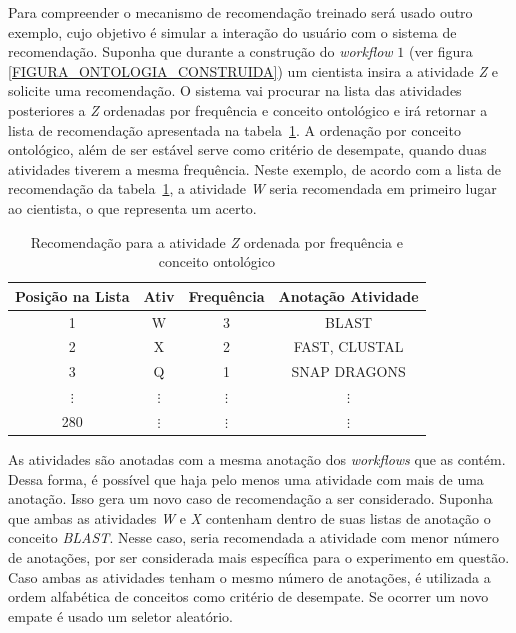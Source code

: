 \documentclass[10pt,letterpaper]{article}
\begin{document}
Para compreender o mecanismo de recomendação treinado será usado outro exemplo, cujo objetivo é simular a interação do usuário com o sistema de recomendação. Suponha que durante a construção do \emph{workflow} \(1\) (ver figura \ref{FIGURA_ONTOLOGIA_CONSTRUIDA}) um cientista insira a atividade \emph{Z} e solicite uma recomendação. O sistema vai procurar na lista das atividades posteriores a \emph{Z} ordenadas por frequência e conceito ontológico e irá retornar a lista de recomendação apresentada na tabela~\ref{tabela_lista_recomendacao_ordenada_frequencia}. A ordenação por conceito ontológico, além de ser estável serve como critério de desempate, quando duas atividades tiverem a mesma frequência. Neste exemplo, de acordo com a lista de recomendação da tabela~\ref{tabela_lista_recomendacao_ordenada_frequencia}, a atividade \emph{W} seria recomendada em primeiro lugar ao cientista, o que representa um acerto.
\begin{table}[!htb]
	\centering
	\caption{Recomendação para a atividade \emph{Z} ordenada por frequência e conceito ontológico}
	\begin{tabular}{|c|c|c|c|}  \hline
		\textbf{Posição na Lista} & \textbf{Ativ} & \textbf{Frequência} & \textbf{Anotação Atividade} 	\\ \hline
		1				& W 				& 3 				& BLAST				\\ \hline
		2				& X 				& 2 				& FAST, CLUSTAL		\\ \hline
		3				& Q 				& 1 				& SNAP DRAGONS		\\ \hline
		\(\vdots\)		& \(\vdots\)		& \(\vdots\) 		& \(\vdots\)		\\ \hline
		280				& \(\vdots\)		& \(\vdots\)		& \(\vdots\)	\\ \hline
	\end{tabular}
	\label{tabela_lista_recomendacao_ordenada_frequencia}
	\vspace{0.1cm}
\end{table}

As atividades são anotadas com a mesma anotação dos \emph{workflows} que as contém. Dessa forma, é possível que haja pelo menos uma atividade com mais de uma anotação. Isso gera um novo caso de recomendação a ser considerado. Suponha que ambas as atividades \emph{W} e \emph{X} contenham dentro de suas listas de anotação o conceito \emph{BLAST}. Nesse caso, seria recomendada a atividade com menor número de anotações, por ser considerada mais específica para o experimento em questão. Caso ambas as atividades tenham o mesmo número de anotações, é utilizada a ordem alfabética de conceitos como critério de desempate. Se ocorrer um novo empate é usado um seletor aleatório.
\end{document}
